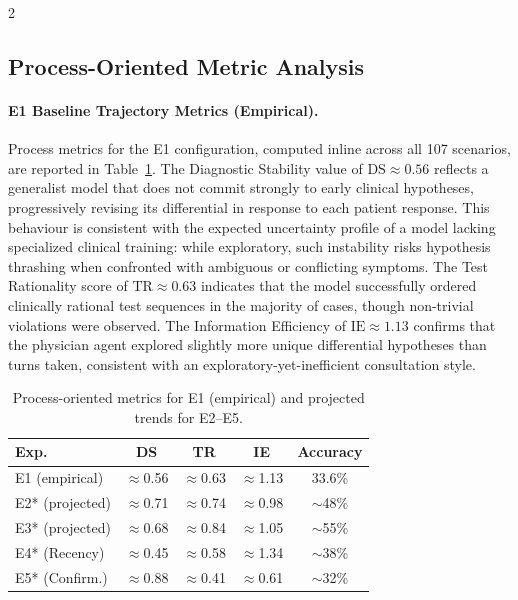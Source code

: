 \documentclass[10pt, a4paper]{article}
\newcommand{\DS}{\mathrm{DS}}
\newcommand{\TR}{\mathrm{TR}}
\newcommand{\IE}{\mathrm{IE}}
\begin{document}
\begin{multicols}{2}
\subsection{Process-Oriented Metric Analysis}
\label{ssec:process_metrics}

\paragraph{E1 Baseline Trajectory Metrics (Empirical).}
Process metrics for the E1 configuration, computed inline across all 107 scenarios, are reported in Table~\ref{tab:process_metrics}. The Diagnostic Stability value of $\DS \approx 0.56$ reflects a generalist model that does not commit strongly to early clinical hypotheses, progressively revising its differential in response to each patient response. This behaviour is consistent with the expected uncertainty profile of a model lacking specialized clinical training: while exploratory, such instability risks hypothesis thrashing when confronted with ambiguous or conflicting symptoms. The Test Rationality score of $\TR \approx 0.63$ indicates that the model successfully ordered clinically rational test sequences in the majority of cases, though non-trivial violations were observed. The Information Efficiency of $\IE \approx 1.13$ confirms that the physician agent explored slightly more unique differential hypotheses than turns taken, consistent with an exploratory-yet-inefficient consultation style.

\begin{table}[H]
\centering
\caption{Process-oriented metrics for E1 (empirical) and projected trends for E2–E5.}
\label{tab:process_metrics}
\scriptsize
\begin{tabular}{@{}lcccc@{}}
\toprule
\textbf{Exp.} & \textbf{DS} & \textbf{TR} & \textbf{IE} & \textbf{Accuracy}\\
\midrule
E1 (empirical)   & $\approx$0.56 & $\approx$0.63 & $\approx$1.13 & 33.6\% \\
E2* (projected)  & $\approx$0.71 & $\approx$0.74 & $\approx$0.98 & $\sim$48\% \\
E3* (projected)  & $\approx$0.68 & $\approx$0.84 & $\approx$1.05 & $\sim$55\% \\
E4* (Recency)    & $\approx$0.45 & $\approx$0.58 & $\approx$1.34 & $\sim$38\% \\
E5* (Confirm.)   & $\approx$0.88 & $\approx$0.41 & $\approx$0.61 & $\sim$32\% \\
\bottomrule
\end{tabular}
\end{table}


\end{multicols}
\end{document}
